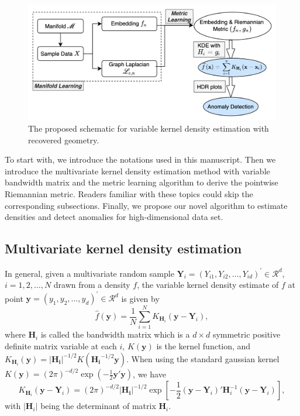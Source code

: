 \documentclass[11pt,a4paper,]{article}
\begin{document}
\begin{figure}

{\centering \includegraphics[width=0.95\linewidth]{figures/vkde} 

}

\caption{The proposed schematic for variable kernel density estimation with recovered geometry.}\label{fig:vkde}
\end{figure}

To start with, we introduce the notations used in this manuscript. Then we introduce the multivariate kernel density estimation method with variable bandwidth matrix and the metric learning algorithm to derive the pointwise Riemannian metric. Readers familiar with these topics could skip the corresponding subsections. Finally, we propose our novel algorithm to estimate densities and detect anomalies for high-dimensional data set.

\hypertarget{multivariate-kernel-density-estimation}{%
\subsection{Multivariate kernel density estimation}\label{multivariate-kernel-density-estimation}}

In general, given a multivariate random sample \(\pmb{Y}_i=(Y_{i1}, Y_{i2}, \dots, Y_{id})^\prime \in \mathcal{R}^d\), \(i = 1, 2, \dots, N\) drawn from a density \(f\), the variable kernel density estimate of \(f\) at point \(\pmb{y}=(y_1, y_2, \dots, y_d)^\prime \in \mathcal{R}^d\) is given by
\begin{equation}
\label{eq:kde}
\hat{f}(\pmb{y})=\frac{1}{N}\sum\limits_{i=1}^N K_{\pmb{H}_i}(\pmb{y}-\pmb{Y}_i),
\end{equation}
where \(\pmb{H}_i\) is called the bandwidth matrix which is a \(d\times d\) symmetric positive definite matrix variable at each \(i\), \(K(\pmb{y})\) is the kernel function, and \(K_{\pmb{H}_i}(\pmb{y}) = |\pmb{H_i}|^{-1/2} K(\pmb{H_i}^{-1/2}\pmb{y})\). When using the standard gaussian kernel \(K(\pmb{y}) = (2\pi)^{-d/2}\exp(-\frac{1}{2}\pmb{y}'\pmb{y})\), we have
\begin{equation}
\label{eq:kernel}
K_{\pmb{H}_i}(\pmb{y}-\pmb{Y}_i)=(2\pi)^{-d/2}|\pmb{H_i}|^{-1/2}\exp\left[-\frac{1}{2}(\pmb{y}-\pmb{Y}_i)'\pmb{H}_i^{-1}(\pmb{y}-\pmb{Y}_i)\right],
\end{equation}
with \(|\pmb{H}_i|\) being the determinant of matrix \(\pmb{H}_i\).
\end{document}
